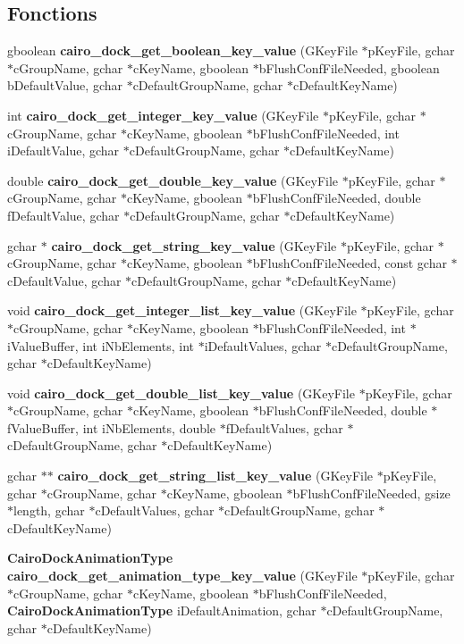 \subsection*{Fonctions}
\begin{CompactItemize}
\item 
gboolean {\bf cairo\_\-dock\_\-get\_\-boolean\_\-key\_\-value} (GKeyFile $\ast$pKeyFile, gchar $\ast$cGroupName, gchar $\ast$cKeyName, gboolean $\ast$bFlushConfFileNeeded, gboolean bDefaultValue, gchar $\ast$cDefaultGroupName, gchar $\ast$cDefaultKeyName)
\item 
int {\bf cairo\_\-dock\_\-get\_\-integer\_\-key\_\-value} (GKeyFile $\ast$pKeyFile, gchar $\ast$cGroupName, gchar $\ast$cKeyName, gboolean $\ast$bFlushConfFileNeeded, int iDefaultValue, gchar $\ast$cDefaultGroupName, gchar $\ast$cDefaultKeyName)
\item 
double {\bf cairo\_\-dock\_\-get\_\-double\_\-key\_\-value} (GKeyFile $\ast$pKeyFile, gchar $\ast$cGroupName, gchar $\ast$cKeyName, gboolean $\ast$bFlushConfFileNeeded, double fDefaultValue, gchar $\ast$cDefaultGroupName, gchar $\ast$cDefaultKeyName)
\item 
gchar $\ast$ {\bf cairo\_\-dock\_\-get\_\-string\_\-key\_\-value} (GKeyFile $\ast$pKeyFile, gchar $\ast$cGroupName, gchar $\ast$cKeyName, gboolean $\ast$bFlushConfFileNeeded, const gchar $\ast$cDefaultValue, gchar $\ast$cDefaultGroupName, gchar $\ast$cDefaultKeyName)
\item 
void {\bf cairo\_\-dock\_\-get\_\-integer\_\-list\_\-key\_\-value} (GKeyFile $\ast$pKeyFile, gchar $\ast$cGroupName, gchar $\ast$cKeyName, gboolean $\ast$bFlushConfFileNeeded, int $\ast$iValueBuffer, int iNbElements, int $\ast$iDefaultValues, gchar $\ast$cDefaultGroupName, gchar $\ast$cDefaultKeyName)
\item 
void {\bf cairo\_\-dock\_\-get\_\-double\_\-list\_\-key\_\-value} (GKeyFile $\ast$pKeyFile, gchar $\ast$cGroupName, gchar $\ast$cKeyName, gboolean $\ast$bFlushConfFileNeeded, double $\ast$fValueBuffer, int iNbElements, double $\ast$fDefaultValues, gchar $\ast$cDefaultGroupName, gchar $\ast$cDefaultKeyName)
\item 
gchar $\ast$$\ast$ {\bf cairo\_\-dock\_\-get\_\-string\_\-list\_\-key\_\-value} (GKeyFile $\ast$pKeyFile, gchar $\ast$cGroupName, gchar $\ast$cKeyName, gboolean $\ast$bFlushConfFileNeeded, gsize $\ast$length, gchar $\ast$cDefaultValues, gchar $\ast$cDefaultGroupName, gchar $\ast$cDefaultKeyName)
\item 
{\bf CairoDockAnimationType} {\bf cairo\_\-dock\_\-get\_\-animation\_\-type\_\-key\_\-value} (GKeyFile $\ast$pKeyFile, gchar $\ast$cGroupName, gchar $\ast$cKeyName, gboolean $\ast$bFlushConfFileNeeded, {\bf CairoDockAnimationType} iDefaultAnimation, gchar $\ast$cDefaultGroupName, gchar $\ast$cDefaultKeyName)
$$
\end{CompactItemize}
